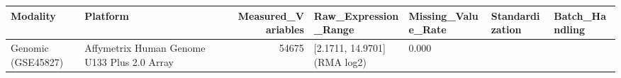 \begin{tabular}{llrllll}
\toprule
Modality & Platform & Measured_Variables & Raw_Expression_Range & Missing_Value_Rate & Standardization & Batch_Handling \\
\midrule
Genomic (GSE45827) & Affymetrix Human Genome U133 Plus 2.0 Array & 54675 & [2.1711, 14.9701] (RMA log2) & 0.000%
\bottomrule
\end{tabular}
